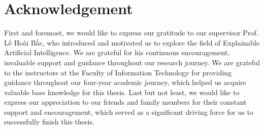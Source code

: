 \chapter*{Acknowledgement}
\label{thanks}

First and foremost, we would like to express our gratitude to our supervisor Prof. Lê Hoài Bắc, who introduced and motivated us to explore the field of Explainable Artificial Intelligence. We are grateful for his continuous encouragement, invaluable support and guidance throughout our research journey. We are grateful to the instructors at the Faculty of Information Technology for providing guidance throughout our four-year academic journey, which helped us acquire valuable base knowledge for this thesis. Last but not least, we would like to express our appreciation to our friends and family members for their constant support and encouragement, which served as a significant driving force for us to successfully finish this thesis.




